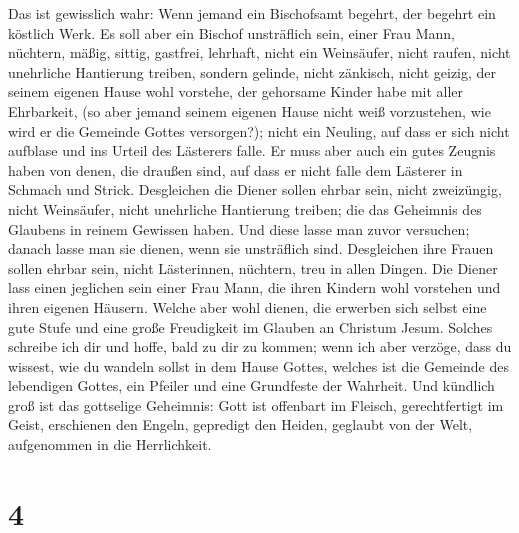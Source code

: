  Das ist gewisslich wahr: Wenn jemand ein Bischofsamt
begehrt, der begehrt ein köstlich Werk.  Es soll aber ein
Bischof unsträflich sein, einer Frau Mann, nüchtern, mäßig, sittig,
gastfrei, lehrhaft,  nicht ein Weinsäufer, nicht raufen,
nicht unehrliche Hantierung treiben, sondern gelinde, nicht zänkisch,
nicht geizig,  der seinem eigenen Hause wohl vorstehe, der
gehorsame Kinder habe mit aller Ehrbarkeit,  (so aber
jemand seinem eigenen Hause nicht weiß vorzustehen, wie wird er die
Gemeinde Gottes versorgen?);  nicht ein Neuling, auf dass
er sich nicht aufblase und ins Urteil des Lästerers falle.
 Er muss aber auch ein gutes Zeugnis haben von denen, die
draußen sind, auf dass er nicht falle dem Lästerer in Schmach und
Strick.  Desgleichen die Diener sollen ehrbar sein, nicht
zweizüngig, nicht Weinsäufer, nicht unehrliche Hantierung treiben;
 die das Geheimnis des Glaubens in reinem Gewissen haben.
 Und diese lasse man zuvor versuchen; danach lasse man
sie dienen, wenn sie unsträflich sind.  Desgleichen ihre
Frauen sollen ehrbar sein, nicht Lästerinnen, nüchtern, treu in allen
Dingen.  Die Diener lass einen jeglichen sein einer Frau
Mann, die ihren Kindern wohl vorstehen und ihren eigenen Häusern.
 Welche aber wohl dienen, die erwerben sich selbst eine
gute Stufe und eine große Freudigkeit im Glauben an Christum Jesum.
 Solches schreibe ich dir und hoffe, bald zu dir zu
kommen;  wenn ich aber verzöge, dass du wissest, wie du
wandeln sollst in dem Hause Gottes, welches ist die Gemeinde des
lebendigen Gottes, ein Pfeiler und eine Grundfeste der Wahrheit.
 Und kündlich groß ist das gottselige Geheimnis: Gott ist
offenbart im Fleisch, gerechtfertigt im Geist, erschienen den Engeln,
gepredigt den Heiden, geglaubt von der Welt, aufgenommen in die
Herrlichkeit.

\hypertarget{section-3}{%
\section{4}\label{section-3}}


